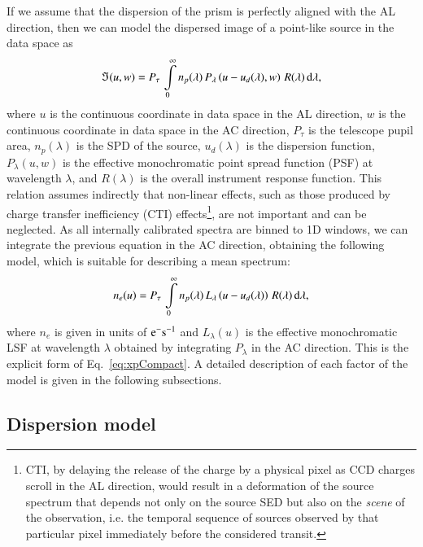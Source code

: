 \documentclass{aa}
\newcommand{\pupil}{\ensuremath{P_\tau}}
\newcommand{\equref}[1]{Eq.~\ref{eq:#1}}
\begin{document}
If we assume that the dispersion of the prism is perfectly aligned with the AL direction, then we can model the dispersed image of a point-like source in the data space as
\begin{equation}
    \Im(u, w) =  \pupil\, \int\limits_0^\infty n_p(\lambda) \, P_\lambda\left(u - u_d(\lambda), w \right) \, R(\lambda) \, {\rm d}\lambda
    \label{eq:2Dmodel}
,\end{equation}
where 
$u$ is the continuous coordinate in data space in the AL direction, $w$ is the continuous coordinate in data space in the AC direction, $P_\tau$ is the telescope pupil area, $n_p(\lambda)$ is the SPD of the source,
$u_d(\lambda)$ is the dispersion function, $P_\lambda(u, w)$ is the effective monochromatic point spread function (PSF) at wavelength $\lambda$, and $R(\lambda)$ is the overall instrument response function.
This relation assumes indirectly that non-linear effects, such as those produced by charge transfer inefficiency (CTI) effects\footnote{CTI, by delaying the release of the charge by a physical pixel as CCD charges scroll in the AL direction, would result in a deformation of the source spectrum that depends not only on the source SED but also on the \emph{scene} of the observation, i.e. the temporal sequence of sources observed by that particular pixel immediately before the considered transit.}, are not important and can be neglected.
As all internally calibrated spectra are binned to 1D windows, we can integrate the previous equation in the AC direction, obtaining the following model, which is suitable for describing a mean spectrum:
\begin{equation}
   n_{e}(u)=  \pupil\, \int\limits_0^\infty n_p(\lambda) \, L_\lambda\left(u - u_d(\lambda)\right) \, R(\lambda) \, {\rm d}\lambda
   \label{eq:model}
,\end{equation}
where $n_{e}$ is given in units of $\rm e^- s^{-1}$ and $L_\lambda(u)$ is the effective monochromatic LSF at wavelength $\lambda$ obtained by integrating $P_\lambda$ in the AC direction. This is the explicit form of \equref{xpCompact}.
A detailed description of each factor of the model is given in the following subsections.

\subsection{Dispersion model}\label{sec:dispersion}
\end{document}
